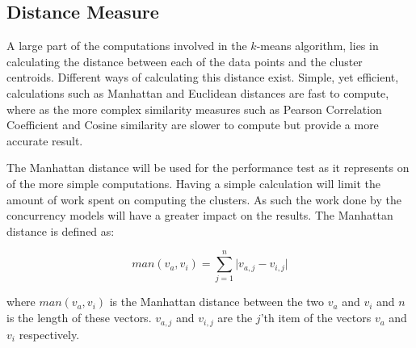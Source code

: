 \subsection{Distance Measure}
A large part of the computations involved in the $k$-means algorithm, lies in calculating the distance between each of the data points and the cluster centroids. Different ways of calculating this distance exist. Simple, yet efficient, calculations such as Manhattan and Euclidean\cite[p. 41]{amatriain2011data} distances are fast to compute, where as the more complex similarity measures such as Pearson Correlation Coefficient and Cosine similarity\cite[p. 42]{amatriain2011data}\cite{breese1998empirical} are slower to compute but provide a more accurate result.

The Manhattan distance will be used for the performance test as it represents on of the more simple computations. Having a simple calculation will limit the amount of work spent on computing the clusters. As such the work done by the concurrency models will have a greater impact on the results. The Manhattan distance is defined as\cite[p. 41]{amatriain2011data}:
 
\begin{equation}\label{eq:mandistance}
man(v_a,v_i)=\sum_{j=1}^{n}\lvert v_{a,j}-v_{i,j}\rvert
\end{equation}

where $man(v_a,v_i)$ is the Manhattan distance between the two $v_a$ and $v_i$ and $n$ is the length of these vectors. $v_{a,j}$ and $v_{i,j}$ are the $j$'th item of the vectors $v_a$ and $v_i$ respectively.

%
%
